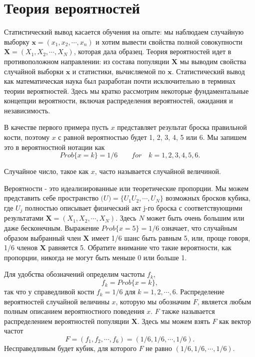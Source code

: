 \section{Теория вероятностей}

Статистический вывод касается обучения на опыте: мы наблюдаем случайную выборку $\mathbf{x} = (x_1, x_2, \cdots, x_n)$ и хотим вывести свойства полной совокупности $\mathbf{X} = (X_1, X_2,\cdots, X_N)$, которая дала образец. Теория вероятностей идет в противоположном направлении: из состава популяции $\mathbf{X}$ мы выводим свойства случайной выборки $\mathbf{x}$ и статистики, вычисляемой по $\mathbf{x}$. Статистический вывод как математическая наука был разработан почти исключительно в терминах теории вероятностей. Здесь мы кратко рассмотрим некоторые фундаментальные концепции вероятности, включая распределения вероятностей, ожидания и независимость. 

В качестве первого примера пусть $x$ представляет результат броска правильной кости, поэтому $x$ с равной вероятностью будет 1, 2, 3, 4, 5 или 6. Мы запишем это в вероятностной нотации как 
\begin{equation}
    Prob\{x=k\}=1/6\qquad for\quad k=1,2,3,4,5,6.
\end{equation}

Случайное число, такое как $x$, часто называется случайной величиной. 

Вероятности - это идеализированные или теоретические пропорции. Мы можем представить себе пространство $\mathbf(U) = \{U_1 U_2, \cdots, U_N\}$ возможных бросков кубика, где $U_j$ полностью описывает физический акт j-го броска с соответствующими результатами $\mathbf{X} = (X_1, X_2,\cdots, X_N)$. Здесь $N$ может быть очень большим или даже бесконечным. Выражение $Prob\{x = 5\} = 1/6$ означает, что случайным образом выбранный член $\mathbf{X}$ имеет 1/6 шанс быть равным 5, или, проще говоря, 1/6 членов $\mathbf{X}$ равняется 5. Обратите внимание что такие вероятности, как пропорции, никогда не могут быть меньше 0 или больше 1. 

Для удобства обозначений определим частоты $f_k$, 
\begin{equation}
    f_k=Prob\{x=k\},
\end{equation}
так что у справедливой кости $f_k = 1/6$ для $k = 1, 2, \cdots, 6$. Распределение вероятностей случайной величины $x$, которую мы обозначим $F$, является любым полным описанием вероятностного поведения $x$. $F$ также называется распределением вероятностей популяции $\mathbf{X}$. Здесь мы можем взять $F$ как вектор частот 
\begin{equation}
    F=(f_1,f_2,\cdots,f_6)=(1/6, 1/6, \cdots,1/6).
\end{equation}
Несправедливым будет кубик, для которого $F$ не равно $(1/6, 1/6, \cdots,1/6)$. 

